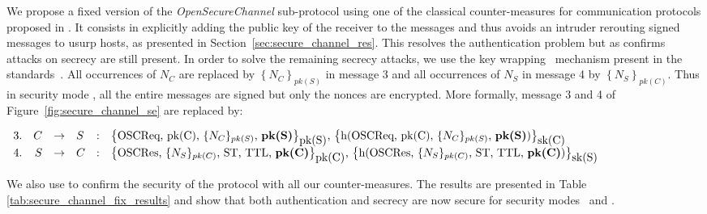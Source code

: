 We propose a fixed version of the {\em OpenSecureChannel} sub-protocol using
one of the classical counter-measures for communication protocols proposed in
\cite{AN96}.
It consists in explicitly adding the public key of the receiver to the
messages and thus avoids an intruder rerouting signed messages to
usurp hosts, as presented in Section~\ref{sec:secure_channel_res}. This
resolves the authentication problem but as \proverif{} confirms
attacks on secrecy are still present. In order to solve the remaining
secrecy attacks, we use the key wrapping~\cite{FLS11} mechanism
present in the \opcua{}
standards~\cite{MLD09,opcua_part2,opcua_part4,opcua_part6}.
All occurrences of
$N_{C}$ are replaced by $\left\{\mbox{$N_{C}$}\right\}_{pk(S)}$ in
message 3 and all occurrences of $N_{S}$ in message 4 by
$\left\{\mbox{$N_{S}$}\right\}_{pk(C)}$.  Thus in security mode \sms, all the
entire messages are signed but only the nonces are encrypted.
More formally, message 3 and 4 of Figure~\ref{fig:secure_channel_se}
are replaced by:
\begin{flushleft}
\arraycolsep=1.4pt
{\scriptsize
    $\begin{array}{lrllll}
        3. & C & \rightarrow & S & : & \text{\sm{\oscreq, pk(C), $\{N_{C}\}_{pk(S)}$, {\bf pk(S)}}{pk(S)}{sk(C)}}\\
        4. & S & \rightarrow & C & : & \text{\sm{\oscres, $\{N_{S}\}_{pk(C)}$, ST, TTL, {\bf pk(C)}}{pk(C)}{sk(S)}}\\
    \end{array}$
}
\end{flushleft}

 We also use \proverif to confirm the security of the protocol with all
 our counter-measures.  The results are presented in Table
 \ref{tab:secure_channel_fix_results} and show that both
 authentication and secrecy are now secure for security modes \sms~and
 \smse. %

